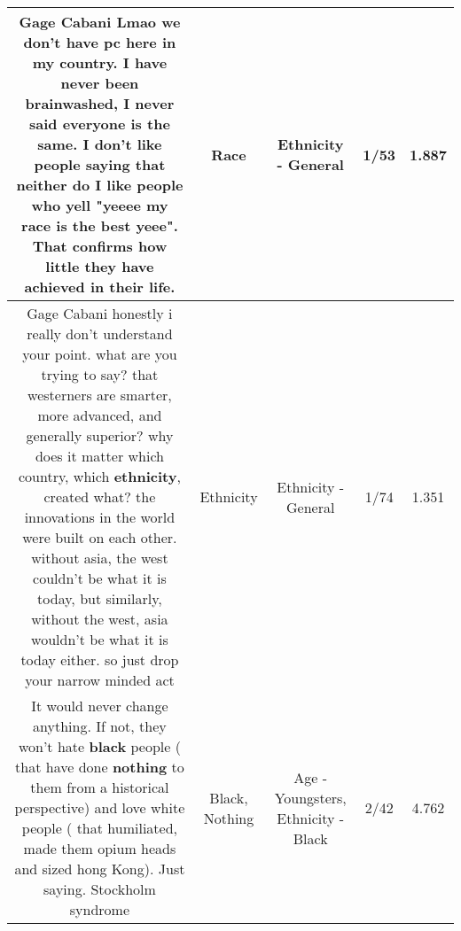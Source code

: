 \documentclass[11pt]{article}
\newlength\mylength
\begin{document}
\begin{center}
\begin{longtable}{|C{.65\mylength}|C{.30\mylength}|C{.12\mylength}|C{.12\mylength}|C{.12\mylength}|}
  \small Gage Cabani Lmao we don't have pc here in my country. I have never been brainwashed, I never said everyone is the same. I don't like people saying that neither do I like people who yell "yeeee my \textbf{race} is the best yeee". That confirms how little they have achieved in their life.\normalsize   & Race & Ethnicity - General & 1/53 & 1.887 \\  \hline
  \small Gage Cabani honestly i really don't understand your point. what are you trying to say? that westerners are smarter, more advanced, and generally superior? why does it matter which country, which \textbf{ethnicity}, created what? the innovations in the world were built on each other. without asia, the west couldn't be what it is today, but similarly, without the west, asia wouldn't be what it is today either. so just drop your narrow minded act\normalsize   & Ethnicity & Ethnicity - General & 1/74 & 1.351 \\  \hline
  \small It would never change anything. If not,  they won't hate \textbf{black} people ( that have done \textbf{nothing} to them from a historical perspective) and love white people ( that humiliated, made them opium heads and sized hong Kong). Just saying. Stockholm syndrome\normalsize   & Black, Nothing & Age - Youngsters, Ethnicity - Black & 2/42 & 4.762 \\  \hline

\end{longtable}
\end{center}
\end{document}
